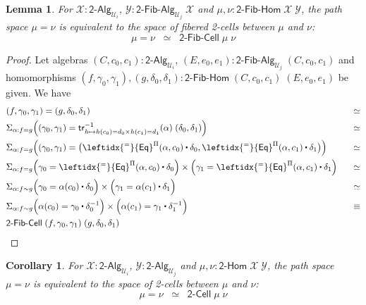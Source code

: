 \documentclass[11pt]{article}
\newcommand{\X}{\mathcal{X}}
\newcommand{\Y}{\mathcal{Y}}
\newcommand{\sm}[1]{\Sigma_{#1}}
\newcommand{\happly}{\leftidx{^=}{\mathsf{Eq}}^{\Pi}}
\newcommand{\UU}{\mathcal{U}}
\newcommand{\BoolAlg}{\mathsf{2}\text{-}\mathsf{Alg}}
\newcommand{\BoolHom}{\mathsf{2}\text{-}\mathsf{Hom}}
\newcommand{\BoolCell}{\mathsf{2}\text{-}\mathsf{Cell}}
\newcommand{\BoolFibCell}{\mathsf{2}\text{-}\mathsf{Fib}\text{-}\mathsf{Cell}}
\newcommand{\BoolFibAlg}{\mathsf{2}\text{-}\mathsf{Fib}\text{-}\mathsf{Alg}}
\newcommand{\BoolFibHom}{\mathsf{2}\text{-}\mathsf{Fib}\text{-}\mathsf{Hom}}
\newcommand{\trans}{\mathsf{tr}}
\newcommand{\ct}{%
  \mathchoice{\mathbin{\raisebox{0.5ex}{$\displaystyle\centerdot$}}}%
             {\mathbin{\raisebox{0.5ex}{$\centerdot$}}}%
             {\mathbin{\raisebox{0.25ex}{$\scriptstyle\,\centerdot\,$}}}%
             {\mathbin{\raisebox{0.1ex}{$\scriptscriptstyle\,\centerdot\,$}}}}
\newtheorem{lemma}[theorem]{Lemma}
\newtheorem{corollary}[theorem]{Corollary}
\theoremstyle{definition}
\begin{document}
\begin{lemma}\label{BoolFibHomSpace}
For $\X : \BoolAlg_{\UU_i}$, $\Y : \BoolFibAlg_{\UU_j} \; \X$ and $\mu,\nu : \BoolFibHom \; \X \; \Y$, the path space $\mu = \nu$ is equivalent to the space of fibered 2-cells between $\mu$ and $\nu$:
\[ \mu = \nu \;\; \simeq \;\; \BoolFibCell \; \mu \; \nu \] 
\end{lemma}
\begin{proof}
Let algebras $(C,c_0,c_1) : \BoolAlg_{\UU_i}$, $(E,e_0,e_1) : \BoolFibAlg_{\UU_j} \; (C,c_0,c_1)$ and homomorphisms $(f,\gamma_0,\gamma_1), (g,\delta_0,\delta_1) : \BoolFibHom \; (C,c_0,c_1) \; (E,e_0,e_1)$ be given. We have
\begin{alignat*}{4}
& (f,\gamma_0,\gamma_1) = (g,\delta_0,\delta_1) & \simeq \\
& \sm{\alpha : f = g} \Big((\gamma_0,\gamma_1) = \trans^{-1}_{h \mapsto h(c_0) = d_0 \times h(c_1) = d_1}(\alpha) \; (\delta_0,\delta_1) \Big) & \simeq \\
& \sm{\alpha : f = g} \Big((\gamma_0,\gamma_1) = \big(\happly(\alpha,c_0) \ct \delta_0, \happly(\alpha,c_1) \ct \delta_1\big) \Big) & \simeq \\
& \sm{\alpha : f = g} \Big(\gamma_0 = \happly(\alpha,c_0) \ct \delta_0\Big) \times \Big( \gamma_1 = \happly(\alpha,c_1) \ct \delta_1 \Big) & \;\;\; \simeq \\
& \sm{\alpha : f \sim g} \Big(\gamma_0 = \alpha(c_0) \ct \delta_0\Big) \times \Big(\gamma_1 = \alpha(c_1) \ct \delta_1 \Big) & \simeq \\
& \sm{\alpha : f \sim g} \Big(\alpha(c_0) = \gamma_0 \ct \delta^{-1}_0\Big) \times \Big(\alpha(c_1) = \gamma_1 \ct \delta^{-1}_1 \Big) & \equiv \\
& \BoolFibCell \; (f,\gamma_0,\gamma_1) \; (g,\delta_0,\delta_1)
\end{alignat*}
\end{proof}

\begin{corollary}\label{BoolHomSpace}
For $\X : \BoolAlg_{\UU_i}$, $\Y : \BoolAlg_{\UU_j}$ and $\mu,\nu : \BoolHom \; \X \; \Y$, the path space $\mu = \nu$ is equivalent to the space of 2-cells between $\mu$ and $\nu$:
\[ \mu = \nu \;\; \simeq \;\; \BoolCell \; \mu \; \nu \] 
\end{corollary}
\end{document}
